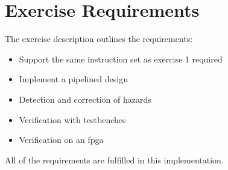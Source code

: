 \section{Exercise Requirements}
The exercise description outlines the requirements\cite[Section 5.3]{bib:compendium}:

\begin{itemize}
    \item   Support the same instruction set as exercise 1 required\cite[Section 4.3]{bib:compendium}
    \item   Implement a pipelined design
    \item   Detection and correction of hazards
    \item   Verification with testbenches
    \item   Verification on an \gls{fpga}
\end{itemize}

\noindent
All of the requirements are fulfilled in this implementation.

